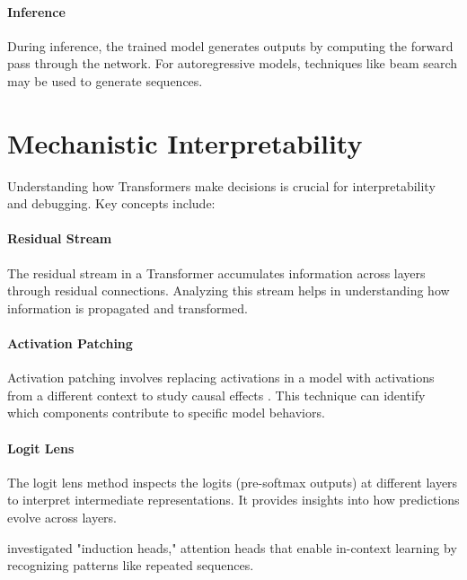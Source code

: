 
\paragraph{Inference}

During inference, the trained model generates outputs by computing the forward pass through the network. For autoregressive models, techniques like beam search may be used to generate sequences.



\section{Mechanistic Interpretability}\label{sec:mech_interp}


Understanding how Transformers make decisions is crucial for interpretability and debugging. Key concepts include:

\paragraph{Residual Stream}

The residual stream in a Transformer accumulates information across layers through residual connections. Analyzing this stream helps in understanding how information is propagated and transformed.

\paragraph{Activation Patching}

Activation patching involves replacing activations in a model with activations from a different context to study causal effects \parencite{olsson_-context_2022}. This technique can identify which components contribute to specific model behaviors.

\paragraph{Logit Lens}

The logit lens method inspects the logits (pre-softmax outputs) at different layers to interpret intermediate representations. It provides insights into how predictions evolve across layers.

\textcite{olsson_-context_2022} investigated "induction heads," attention heads that enable in-context learning by recognizing patterns like repeated sequences.

